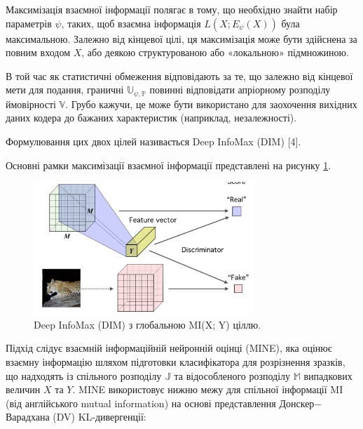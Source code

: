 Максимізація взаємної інформації полягає в тому, що необхідно знайти набір параметрів $\psi$, таких, щоб взаємна інформація $L(X; E_{\psi} (X))$ була максимальною. Залежно від кінцевої цілі, ця максимізація може бути здійснена за повним входом $X$, або деякою структурованою або «локальною» підмножиною.

В той час як статистичні обмеження відповідають за те, що залежно від кінцевої мети для подання, граничні $\mathbb{U}_{\psi, \mathbb{P}}$ повинні відповідати апріорному розподілу ймовірності $\mathbb{V}$. Грубо кажучи, це може бути використано для заохочення вихідних даних кодера до бажаних характеристик (наприклад, незалежності).

Формулювання цих двох цілей називається Deep InfoMax (DIM) [4].


Основні рамки максимізації взаємної інформації представлені на рисунку \ref{fig:deepinfo2}. 

\newpage

\vspace{1em}

\begin{figure}[h]
  \includegraphics[width=\textwidth, height=5cm, natwidth=266, natheight=160]{Mal/deepinfo2.jpg}
  \caption{Deep InfoMax (DIM) з глобальною MI(X; Y) ціллю.}
  \label{fig:deepinfo2}
\end{figure}

Підхід слідує взаємній інформаційній нейронній оцінці (MINE), яка оцінює взаємну інформацію шляхом підготовки класифікатора для розрізнення зразків, що надходять із спільного розподілу $\mathbb{J}$ та відособленого розподілу $\mathbb{M}$ випадкових величин $X$ та $Y$. MINE використовує нижню межу для спільної інформації MI (від англійського mutual information) на основі представлення Донскер$-$Варадхана (DV) KL-дивергенції:

